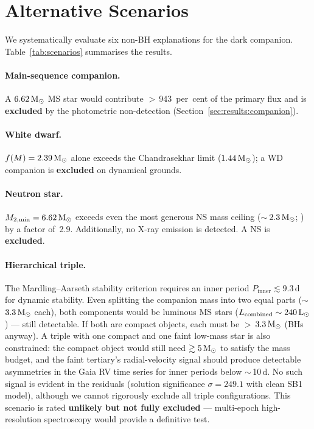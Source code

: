 \documentclass[usenatbib,fleqn]{mnras}
\newcommand{\Msun}{{\rm M}_\odot}
\newcommand{\Lsun}{{\rm L}_\odot}
\newcommand{\fmass}{f(M)}
\begin{document}
\section{Alternative Scenarios}
\label{sec:alternatives}

We systematically evaluate six non-BH explanations for the dark
companion.  Table~\ref{tab:scenarios} summarises the results.

\paragraph{Main-sequence companion.}
A $6.62\,\Msun$ MS star would contribute $>$\,943~per~cent of the
primary flux and is \textbf{excluded} by the photometric
non-detection (Section~\ref{sec:results:companion}).

\paragraph{White dwarf.}
$\fmass = 2.39\,\Msun$ alone exceeds the Chandrasekhar limit
($1.44\,\Msun$); a WD companion is \textbf{excluded} on
dynamical grounds.

\paragraph{Neutron star.}
$M_{2,\min} = 6.62\,\Msun$ exceeds even the most generous NS mass
ceiling ($\sim$\,$2.3\,\Msun$; \citealt{Rezzolla2018}) by a factor
of~2.9.  Additionally, no X-ray emission is detected.  A NS is
\textbf{excluded}.

\paragraph{Hierarchical triple.}
The Mardling--Aarseth stability criterion
\citep{MardlingAarseth2001} requires an inner period
$P_\mathrm{inner} \lesssim 9.3$\,d for dynamic stability.  Even
splitting the companion mass into two equal parts
($\sim$\,$3.3\,\Msun$ each), both components would be luminous MS
stars ($L_\mathrm{combined} \sim 240\,\Lsun$) --- still detectable.
If both are compact objects, each must be $>$\,$3.3\,\Msun$ (BHs
anyway).  A triple with one compact and one faint low-mass star
is also constrained: the compact object would still need
$\gtrsim 5\,\Msun$ to satisfy the mass budget, and the faint
tertiary's radial-velocity signal should produce detectable
asymmetries in the Gaia RV time series for inner periods
below $\sim$\,10\,d.  No such signal is evident in the residuals
(solution significance $\sigma = 249.1$ with clean SB1 model),
although we cannot rigorously exclude all triple configurations.
This scenario is rated \textbf{unlikely but not fully excluded}
--- multi-epoch high-resolution spectroscopy would provide a
definitive test.
\end{document}
